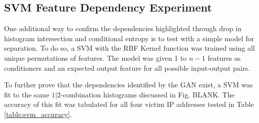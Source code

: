 %
%
%





\printglossary[type=main]

\begin{appendices}
	
	\chapter{SVM Feature Dependency Experiment}
	\label{sec:svm_app}
	
	
	One additional way to confirm the dependencies highlighted through drop in histogram intersection and conditional entropy is to test with a simple model for separation. To do so, a SVM with the RBF Kernel function was trained using all unique permutations of features. The model was given 1 to $n-1$ features as conditioners and an expected output feature for all possible input-output pairs. 
	
	To further prove that the dependencies identified by the GAN exist, a SVM was fit to the same $1|2$-combination histograms discussed in Fig. BLANK. The accuracy of this fit was tabulated for all four victim IP addresses tested in Table \ref{table:svm_accuracy}.
	

\end{appendices}
